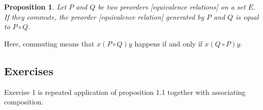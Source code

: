 \documentclass[11pt]{article}
\theoremstyle{plain}
\newtheorem{freeprop}[definition]{Proposition}
\theoremstyle{nonumberplain}
\begin{document}
\begin{freeprop}
    Let $P$ and $Q$ be two preorders [equivalence relations] on a set $E$. If they commute, the preorder [equivalence relation] generated by $P$ and $Q$ is equal to $P \circ Q$.
\end{freeprop}

Here, commuting means that $x (P \circ Q) y$ happens if and only if $x (Q \circ P) y$.

\subsection{Exercises}

Exercise 1 is repeated application of proposition 1.1 together with associating composition.
\end{document}
